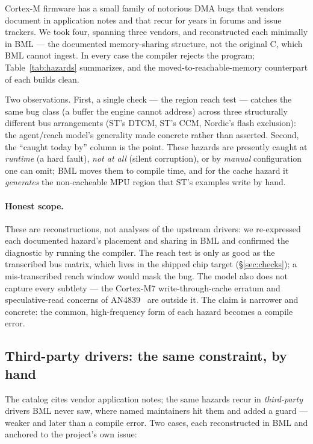 \documentclass[10pt,twocolumn]{article}
\begin{document}
Cortex-M firmware has a small family of notorious DMA bugs that vendors document
in application notes and that recur for years in forums and issue trackers. We
took four, spanning three vendors, and reconstructed each minimally in BML --- the
documented memory-sharing structure, not the original C, which BML cannot
ingest. In every case the compiler rejects the program;
Table~\ref{tab:hazards} summarizes, and the moved-to-reachable-memory
counterpart of each builds clean.

Two observations. First, a single check --- the region reach test --- catches the
same bug class (a buffer the engine cannot address) across three structurally
different bus arrangements (ST's DTCM, ST's CCM, Nordic's flash exclusion): the
agent/reach model's generality made concrete rather than asserted. Second, the
``caught today by'' column is the point. These hazards are presently caught at
\emph{runtime} (a hard fault), \emph{not at all} (silent corruption), or by
\emph{manual} configuration one can omit; BML moves them to compile time, and for
the cache hazard it \emph{generates} the non-cacheable MPU region that ST's
examples write by hand.

\paragraph{Honest scope.} These are reconstructions, not analyses of the upstream
drivers: we re-expressed each documented hazard's placement and sharing in BML
and confirmed the diagnostic by running the compiler. The reach test is only as
good as the transcribed bus matrix, which lives in the shipped chip target
(\S\ref{sec:checks}); a mis-transcribed reach window would mask the bug. The model
also does not capture every subtlety --- the Cortex-M7 write-through-cache erratum
and speculative-read concerns of AN4839~\cite{an4839} are outside it. The claim is
narrower and concrete: the common, high-frequency form of each hazard becomes a
compile error.

\subsection{Third-party drivers: the same constraint, by hand}
\label{sec:eval-thirdparty}

The catalog cites vendor application notes; the same hazards recur in
\emph{third-party} drivers BML never saw, where named maintainers hit them and
added a guard --- weaker and later than a compile error. Two cases, each
reconstructed in BML and anchored to the project's own issue:
\end{document}
